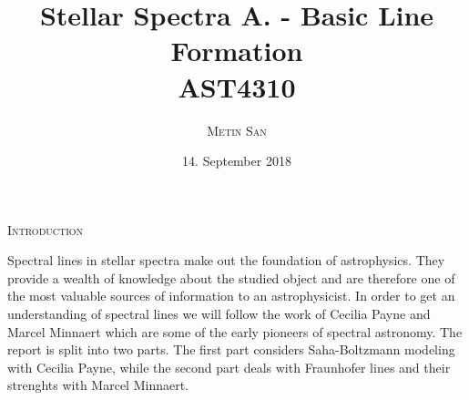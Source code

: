 \documentclass[a4paper,11.5pt,]{article}
\title{Stellar Spectra A. - Basic Line Formation\\
 AST4310}
\date{\normalsize{14. September 2018} }
\author{\textsc{\small{Metin San}}}
\begin{document}
\maketitle
\begin{center}
\textsc{Introduction}
\end{center}


\begin{adjustwidth}{1cm}{1cm}

Spectral lines in stellar spectra make out the foundation of astrophysics. They provide a wealth of knowledge about the studied object and are therefore one of the most valuable sources of information to an astrophysicist. In order to get an understanding of spectral lines we will follow the work of Cecilia Payne and Marcel Minnaert which are some of the early pioneers of spectral astronomy. The report is split into two parts. The first part considers Saha-Boltzmann modeling with Cecilia Payne, while the second part deals with Fraunhofer lines and their strenghts with Marcel Minnaert.
\end{adjustwidth}
\end{document}
